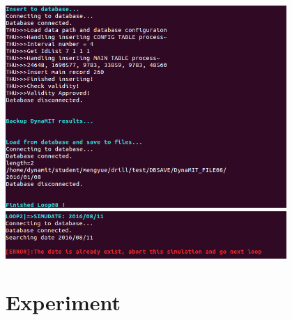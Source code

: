 \documentclass[12pt]{beamer}
\begin{document}
\begin{frame}
\includegraphics[width=0.8\textwidth]
{scst_5.png}
\vspace{0.1in}
\includegraphics[width = 0.8\textwidth]{scst_6.png}
\end{frame}
\section{Experiment}

%
%
\end{document}
